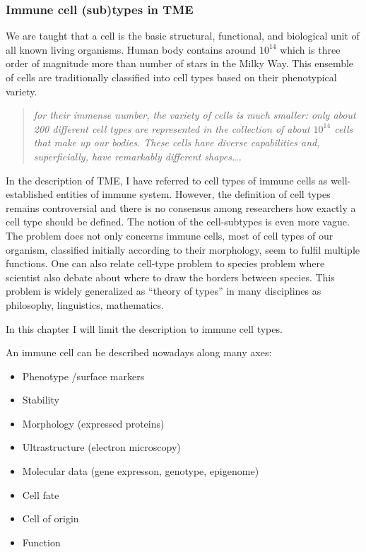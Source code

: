 \documentclass[12pt,]{book}
\providecommand{\tightlist}{%
  \setlength{\itemsep}{0pt}\setlength{\parskip}{0pt}}
\theoremstyle{definition}
\theoremstyle{definition}
\theoremstyle{definition}
\theoremstyle{remark}
\begin{document}
\hypertarget{immune-cell-subtypes-in-tme}{%
\subsubsection{Immune cell (sub)types in
TME}\label{immune-cell-subtypes-in-tme}}

We are taught that a cell is the basic structural, functional, and
biological unit of all known living organisms. Human body contains
around \(10^{14}\) which is three order of magnitude more than number of
stars in the Milky Way. This ensemble of cells are traditionally
classified into cell types based on their phenotypical variety.

\begin{quote}
\emph{for their immense number, the variety of cells is much smaller:
only about 200 different cell types are represented in the collection of
about \(10^{14}\) cells that make up our bodies. These cells have
diverse capabilities and, superficially, have remarkably different
shapes\ldots{}.} \citet{Boal2002}
\end{quote}

In the description of TME, I have referred to cell types of immune cells
as well-established entities of immune system. However, the definition
of cell types remains controversial and there is no consensus among
researchers how exactly a cell type should be defined. The notion of the
cell-subtypes is even more vague. The problem does not only concerns
immune cells, most of cell types of our organism, classified initially
according to their morphology, seem to fulfil multiple functions. One
can also relate cell-type problem to species problem where scientist
also debate about where to draw the borders between species. This
problem is widely generalized as ``theory of types'' \citep{Slater2013}
in many disciplines as philosophy, linguistics, mathematics.

In this chapter I will limit the description to immune cell types.

An immune cell can be described nowadays along many axes:

\begin{itemize}
\tightlist
\item
  Phenotype /surface markers
\item
  Stability
\item
  Morphology (expressed proteins)
\item
  Ultrastructure (electron microscopy)
\item
  Molecular data (gene expresson, genotype, epigenome)
\item
  Cell fate
\item
  Cell of origin
\item
  Function
\end{itemize}
\end{document}

